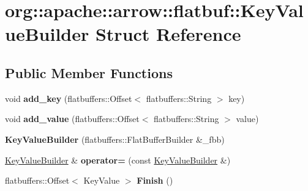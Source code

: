 \hypertarget{structorg_1_1apache_1_1arrow_1_1flatbuf_1_1KeyValueBuilder}{}\section{org\+:\+:apache\+:\+:arrow\+:\+:flatbuf\+:\+:Key\+Value\+Builder Struct Reference}
\label{structorg_1_1apache_1_1arrow_1_1flatbuf_1_1KeyValueBuilder}
\subsection*{Public Member Functions}
\begin{DoxyCompactItemize}
\item 
void {\bfseries add\+\_\+key} (flatbuffers\+::\+Offset$<$ flatbuffers\+::\+String $>$ key)\hypertarget{structorg_1_1apache_1_1arrow_1_1flatbuf_1_1KeyValueBuilder_abdb64caa7067ef03b643ec8e4435d6a0}{}\label{structorg_1_1apache_1_1arrow_1_1flatbuf_1_1KeyValueBuilder_abdb64caa7067ef03b643ec8e4435d6a0}

\item 
void {\bfseries add\+\_\+value} (flatbuffers\+::\+Offset$<$ flatbuffers\+::\+String $>$ value)\hypertarget{structorg_1_1apache_1_1arrow_1_1flatbuf_1_1KeyValueBuilder_a03c2a4fdfc818a41393e054dacfdd122}{}\label{structorg_1_1apache_1_1arrow_1_1flatbuf_1_1KeyValueBuilder_a03c2a4fdfc818a41393e054dacfdd122}

\item 
{\bfseries Key\+Value\+Builder} (flatbuffers\+::\+Flat\+Buffer\+Builder \&\+\_\+fbb)\hypertarget{structorg_1_1apache_1_1arrow_1_1flatbuf_1_1KeyValueBuilder_a54ff534634328cc8082d61b01363cf00}{}\label{structorg_1_1apache_1_1arrow_1_1flatbuf_1_1KeyValueBuilder_a54ff534634328cc8082d61b01363cf00}

\item 
\hyperlink{structorg_1_1apache_1_1arrow_1_1flatbuf_1_1KeyValueBuilder}{Key\+Value\+Builder} \& {\bfseries operator=} (const \hyperlink{structorg_1_1apache_1_1arrow_1_1flatbuf_1_1KeyValueBuilder}{Key\+Value\+Builder} \&)\hypertarget{structorg_1_1apache_1_1arrow_1_1flatbuf_1_1KeyValueBuilder_a7e0bfcfbbe634bbdeabdb3ddc15fb0a1}{}\label{structorg_1_1apache_1_1arrow_1_1flatbuf_1_1KeyValueBuilder_a7e0bfcfbbe634bbdeabdb3ddc15fb0a1}

\item 
flatbuffers\+::\+Offset$<$ Key\+Value $>$ {\bfseries Finish} ()\hypertarget{structorg_1_1apache_1_1arrow_1_1flatbuf_1_1KeyValueBuilder_aa0323f78a4fd58b544618fa12c9df9cb}{}\label{structorg_1_1apache_1_1arrow_1_1flatbuf_1_1KeyValueBuilder_aa0323f78a4fd58b544618fa12c9df9cb}

\end{DoxyCompactItemize}
